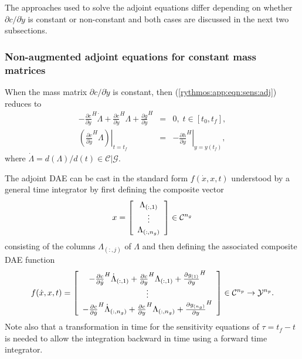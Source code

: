 \documentclass[pdf,ps2pdf,11pt]{SANDreport}
\begin{document}
The approaches used to solve the adjoint equations differ depending on whether
$\partial c / {}\partial {}\dot{y}$ is constant or non-constant and both cases
are discussed in the next two subsections.

\subsubsection{Non-augmented adjoint equations for constant mass matrices}

When the mass matrix $\partial c / {}\partial {}\dot{y}$ is constant, then
(\ref{rythmos:app:eqn:sens:adj}) reduces to
%
\begin{eqnarray}
- \frac{\partial c}{\partial \dot{y}}^H \dot{\Lambda}
+  \frac{\partial c}{\partial y}^H \Lambda + \frac{\partial g}{\partial y}^H
& = & 0, \; t \in \left[ t_0, t_f \right],
\label{rythmos:app:eqn:sens:adj} \\
\left.\left( \frac{\partial c}{\partial \dot{y}}^H \Lambda \right)\right|_{t=t_f}
& = & - \left. \frac{\partial h}{\partial y}^H \right|_{y=y(t_f)},
\label{rythmos:app:eqn:sens:adj:fc}
\end{eqnarray}
%
where $\dot{\Lambda}=d(\Lambda)/d(t)\in\mathcal{C}|\mathcal{G}$.

The adjoint DAE can be cast in the standard form $f(\dot{x},x,t)$ understood
by a general time integrator by first defining the composite vector
%
\begin{equation}
x =
{\bmat{c}
\Lambda_{(:,1)} \\ \vdots \\ \Lambda_{(:,n_g)}
\emat}
\in \mathcal{C}^{n_g}
\end{equation}
%
consisting of the columns $\Lambda_{(:,j)}$ of $\Lambda$ and then defining the
associated composite DAE function
%
\begin{equation}
f(\dot{x},x,t) =
{\bmat{c}
%
- \frac{\partial c}{\partial \dot{y}}^H \dot{\Lambda}_{(:,1)}
+  \frac{\partial c}{\partial y}^H \Lambda_{(:,1)} + \frac{\partial g_{(1)}}{\partial y}^H
%
\\ \vdots \\
%
- \frac{\partial c}{\partial \dot{y}}^H \dot{\Lambda}_{(:,n_g)}
+  \frac{\partial c}{\partial y}^H \Lambda_{(:,n_g)} + \frac{\partial g_{(n_g)}}{\partial y}^H
%
\emat}
\in \mathcal{C}^{n_p} \rightarrow \mathcal{Y}^{n_p}.
\label{rythmos:eqn:adj-sens-daes}
\end{equation}
%
Note also that a transformation in time for the sensitivity equations of $\tau
= t_f - t$ is needed to allow the integration backward in time using a forward
time integrator.
\end{document}
